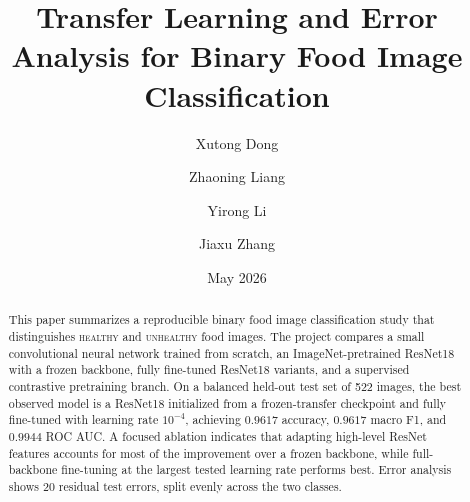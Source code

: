 \documentclass[11pt]{article}
\title{Transfer Learning and Error Analysis for Binary Food Image Classification}
\author{Xutong Dong \and Zhaoning Liang \and Yirong Li \and Jiaxu Zhang}
\date{May 2026}
\newcommand{\Healthy}{\textsc{healthy}}
\newcommand{\Unhealthy}{\textsc{unhealthy}}
\begin{document}
\maketitle

\begin{abstract}
This paper summarizes a reproducible binary food image classification study that distinguishes \Healthy{} and \Unhealthy{} food images. The project compares a small convolutional neural network trained from scratch, an ImageNet-pretrained ResNet18 with a frozen backbone, fully fine-tuned ResNet18 variants, and a supervised contrastive pretraining branch. On a balanced held-out test set of 522 images, the best observed model is a ResNet18 initialized from a frozen-transfer checkpoint and fully fine-tuned with learning rate \(10^{-4}\), achieving \(0.9617\) accuracy, \(0.9617\) macro F1, and \(0.9944\) ROC AUC. A focused ablation indicates that adapting high-level ResNet features accounts for most of the improvement over a frozen backbone, while full-backbone fine-tuning at the largest tested learning rate performs best. Error analysis shows 20 residual test errors, split evenly across the two classes.
\end{abstract}











\appendix

\end{document}
